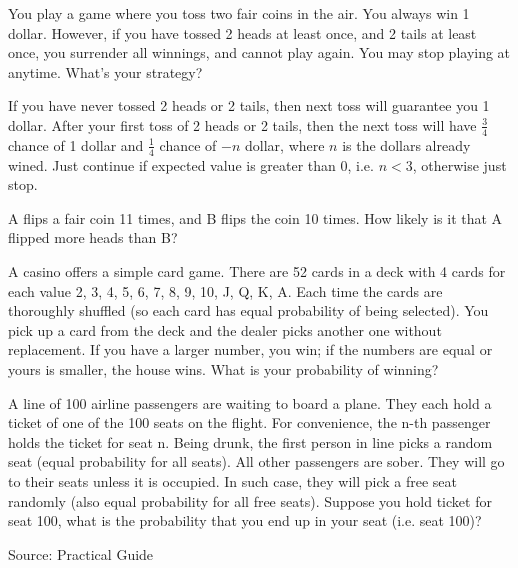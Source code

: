 \begin{exe}
You play a game where you toss two fair coins in the air. You always win 1 dollar. However, if you have tossed 2 heads at least once, and 2 tails at least once, you surrender all winnings, and cannot play again. You may stop playing at anytime. What's your strategy?
\end{exe}
\begin{teacher}
\begin{sol}
If you have never tossed 2 heads or 2 tails, then next toss will guarantee you 1 dollar. After your first toss of 2 heads or 2 tails, then the next toss will have $\frac{3}{4}$ chance of 1 dollar and $\frac{1}{4}$ chance of $-n$ dollar, where $n$ is the dollars already wined. Just continue if expected value is greater than 0, i.e. $n<3$, otherwise just stop.
\end{sol}
\end{teacher}

\begin{exe}
A flips a fair coin 11 times, and B flips the coin 10 times. How likely is it that A flipped more heads than B?
\end{exe}
\begin{teacher}
\begin{sol}
\end{sol}
\end{teacher}

\begin{exe}
A casino offers a simple card game. There are 52 cards in a deck with 4 cards for each
value 2, 3, 4, 5, 6, 7, 8, 9, 10, J, Q, K, A. Each time the cards are thoroughly shuffled
(so each card has equal probability of being selected). You pick up a card from the deck
and the dealer picks another one without replacement. If you have a larger number, you
win; if the numbers are equal or yours is smaller, the house wins. What is your probability of winning? 
\end{exe}
\begin{teacher}
\begin{sol}
\end{sol}
\end{teacher}


\begin{exe}
A line of 100 airline passengers are waiting to board a plane. They each hold a ticket of one of the 100 seats on the flight. For convenience, the n-th passenger holds the ticket for seat n. Being drunk, the first person in line picks a random seat (equal probability for all seats). All other passengers are sober. They will go to their seats unless it is occupied. In such case, they will pick a free seat randomly (also equal probability for all free seats). Suppose you hold ticket for seat 100, what is the probability that you end up in your seat (i.e. seat 100)?
\end{exe}
\begin{teacher}
Source: Practical Guide
\begin{sol}
\end{sol}
\end{teacher}

